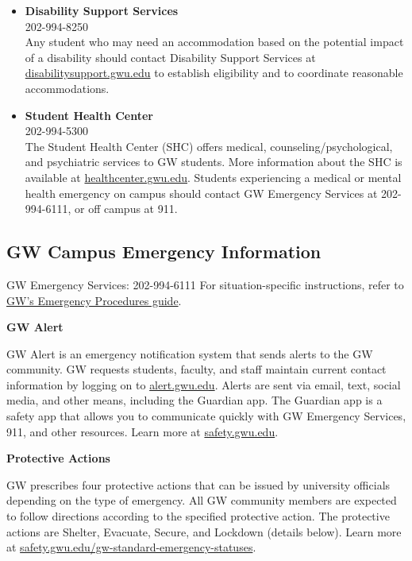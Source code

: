 \documentclass[12pt,letterpaper]{article}
\begin{document}
\begin{itemize}
    \item \textbf{Disability Support Services} \\
    202-994-8250 \\
    Any student who may need an accommodation based on the potential impact of a disability should contact Disability Support Services at \href{https://disabilitysupport.gwu.edu}{disabilitysupport.gwu.edu} to establish eligibility and to coordinate reasonable accommodations.
    \item \textbf{Student Health Center} \\
    202-994-5300\\
    The Student Health Center (SHC) offers medical, counseling/psychological, and psychiatric services to GW students. More information about the SHC is available at \href{https://healthcenter.gwu.edu}{healthcenter.gwu.edu}. Students experiencing a medical or mental health emergency on campus should contact GW Emergency Services at 202-994-6111, or off campus at 911.
\end{itemize}
\vspace{-.5em}

\subsection*{GW Campus Emergency Information}
GW Emergency Services: 202-994-6111
For situation-specific instructions, refer to \href{https://safety.gwu.edu/emergency-response-handbook}{GW's Emergency Procedures guide}.

\textbf{GW Alert}

GW Alert is an emergency notification system that sends alerts to the GW community. GW requests students, faculty, and staff maintain current contact information by logging on to \href{https://alert.gwu.edu}{alert.gwu.edu}. Alerts are sent via email, text, social media, and other means, including the Guardian app. The Guardian app is a safety app that allows you to communicate quickly with GW Emergency Services, 911, and other resources. Learn more at \href{https://safety.gwu.edu}{safety.gwu.edu}.

\textbf{Protective Actions} 

GW prescribes four protective actions that can be issued by university officials depending on the type of emergency. All GW community members are expected to follow directions according to the specified protective action. The protective actions are Shelter, Evacuate, Secure, and Lockdown (details below). Learn more at \href{https://safety.gwu.edu/gw-standard-emergency-statuses}{safety.gwu.edu/gw-standard-emergency-statuses}.
\end{document}
